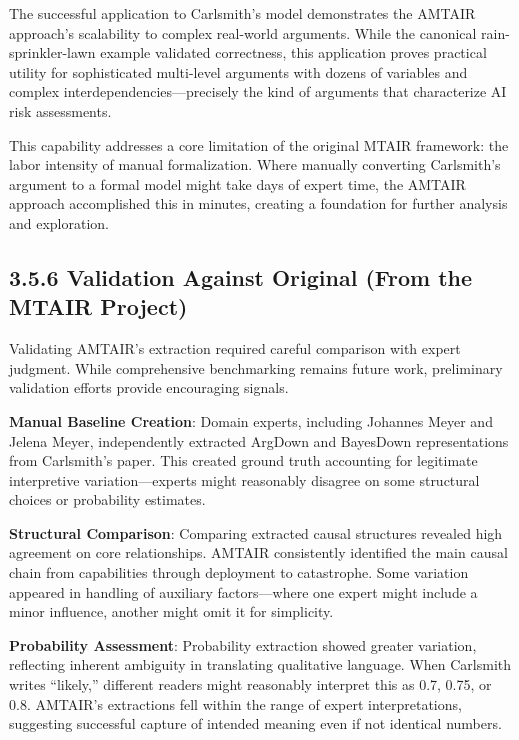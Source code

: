 \documentclass[
  11pt,
  letterpaper,
]{book}
\begin{document}
\begin{landscape}
The successful application to Carlsmith's model demonstrates the AMTAIR
approach's scalability to complex real-world arguments. While the
canonical rain-sprinkler-lawn example validated correctness, this
application proves practical utility for sophisticated multi-level
arguments with dozens of variables and complex
interdependencies---precisely the kind of arguments that characterize AI
risk assessments.

This capability addresses a core limitation of the original MTAIR
framework: the labor intensity of manual formalization. Where manually
converting Carlsmith's argument to a formal model might take days of
expert time, the AMTAIR approach accomplished this in minutes, creating
a foundation for further analysis and exploration.

\end{landscape}

\subsection{3.5.6 Validation Against Original (From the MTAIR
Project)}\label{sec-carlsmith-validation}

Validating AMTAIR's extraction required careful comparison with expert
judgment. While comprehensive benchmarking remains future work,
preliminary validation efforts provide encouraging signals.

\textbf{Manual Baseline Creation}: Domain experts, including Johannes
Meyer and Jelena Meyer, independently extracted ArgDown and BayesDown
representations from Carlsmith's paper. This created ground truth
accounting for legitimate interpretive variation---experts might
reasonably disagree on some structural choices or probability estimates.

\textbf{Structural Comparison}: Comparing extracted causal structures
revealed high agreement on core relationships. AMTAIR consistently
identified the main causal chain from capabilities through deployment to
catastrophe. Some variation appeared in handling of auxiliary
factors---where one expert might include a minor influence, another
might omit it for simplicity.

\textbf{Probability Assessment}: Probability extraction showed greater
variation, reflecting inherent ambiguity in translating qualitative
language. When Carlsmith writes ``likely,'' different readers might
reasonably interpret this as 0.7, 0.75, or 0.8. AMTAIR's extractions
fell within the range of expert interpretations, suggesting successful
capture of intended meaning even if not identical numbers.
\end{document}
